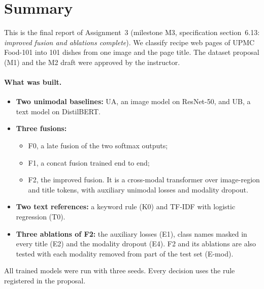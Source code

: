 \section*{Summary}

This is the final report of Assignment~3 (milestone M3, specification section~6.13: \emph{improved fusion and
ablations complete}). We classify recipe web pages of UPMC Food-101 into 101 dishes from one image and the page
title. The dataset proposal (M1) and the M2 draft were approved by the instructor.

\paragraph{What was built.}
\begin{itemize}
  \item \textbf{Two unimodal baselines:} UA, an image model on ResNet-50, and UB, a text model on DistilBERT.
  \item \textbf{Three fusions:}
        \begin{itemize}
          \item F0, a late fusion of the two softmax outputs;
          \item F1, a concat fusion trained end to end;
          \item F2, the improved fusion. It is a cross-modal transformer over image-region and title tokens, with
                auxiliary unimodal losses and modality dropout.
        \end{itemize}
  \item \textbf{Two text references:} a keyword rule (K0) and TF-IDF with logistic regression (T0).
  \item \textbf{Three ablations of F2:} the auxiliary losses (E1), class names masked in every title (E2) and the
        modality dropout (E4). F2 and its ablations are also tested with each modality removed from part of the
        test set (E-mod).
\end{itemize}
All trained models were run with three seeds. Every decision uses the rule registered in the proposal.

